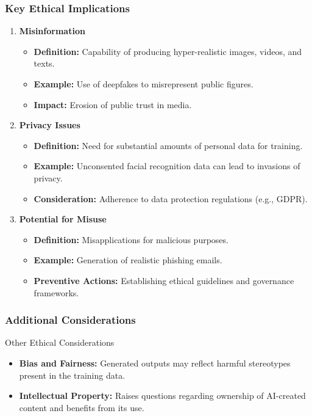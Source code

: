\documentclass[aspectratio=169]{beamer}
\begin{document}
\begin{frame}[fragile]
    \frametitle{Key Ethical Implications}
    \begin{enumerate}
        \item \textbf{Misinformation}
            \begin{itemize}
                \item \textbf{Definition:} Capability of producing hyper-realistic images, videos, and texts.
                \item \textbf{Example:} Use of deepfakes to misrepresent public figures.
                \item \textbf{Impact:} Erosion of public trust in media.
            \end{itemize}

        \item \textbf{Privacy Issues}
            \begin{itemize}
                \item \textbf{Definition:} Need for substantial amounts of personal data for training.
                \item \textbf{Example:} Unconsented facial recognition data can lead to invasions of privacy.
                \item \textbf{Consideration:} Adherence to data protection regulations (e.g., GDPR).
            \end{itemize}
        
        \item \textbf{Potential for Misuse}
            \begin{itemize}
                \item \textbf{Definition:} Misapplications for malicious purposes.
                \item \textbf{Example:} Generation of realistic phishing emails.
                \item \textbf{Preventive Actions:} Establishing ethical guidelines and governance frameworks.
            \end{itemize}
    \end{enumerate}
\end{frame}

\begin{frame}[fragile]
    \frametitle{Additional Considerations}
    \begin{block}{Other Ethical Considerations}
        \begin{itemize}
            \item \textbf{Bias and Fairness:} Generated outputs may reflect harmful stereotypes present in the training data.
            \item \textbf{Intellectual Property:} Raises questions regarding ownership of AI-created content and benefits from its use.
        \end{itemize}
    \end{block}
\end{frame}
\end{document}
